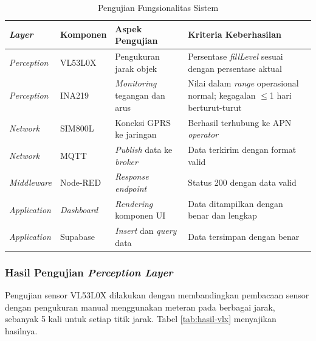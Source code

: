 \begin{table}[H]
  \caption{Pengujian Fungsionalitas Sistem}
  \label{tab:pengujian-fungsionalitas}
  \begin{tabularx}{\textwidth}{| l | l | X | X |}
    \hline
    \textbf{\textit{Layer}} & \textbf{Komponen} & \textbf{Aspek Pengujian} & \textbf{Kriteria Keberhasilan} \\
    \hline
    \textit{Perception} & VL53L0X & Pengukuran jarak objek & Persentase \textit{fillLevel} sesuai dengan persentase aktual \\
    \hline
    \textit{Perception} & INA219 & \textit{Monitoring} tegangan dan arus & Nilai dalam \textit{range} operasional normal; kegagalan $\leq$1 hari berturut-turut \\
    \hline
    \textit{Network} & SIM800L & Koneksi GPRS ke jaringan & Berhasil terhubung ke APN \textit{operator} \\
    \hline
    \textit{Network} & MQTT & \textit{Publish} data ke \textit{broker} & Data terkirim dengan format valid \\
    \hline
    \textit{Middleware} & Node-RED & \textit{Response endpoint} & Status 200 dengan data valid \\
    \hline
    \textit{Application} & \textit{Dashboard} & \textit{Rendering} komponen UI & Data ditampilkan dengan benar dan lengkap \\
    \hline
    \textit{Application} & Supabase & \textit{Insert} dan \textit{query} data & Data tersimpan dengan benar \\
    \hline
  \end{tabularx}
\end{table}

\subsubsection{Hasil Pengujian \textit{Perception Layer}}

Pengujian sensor VL53L0X dilakukan dengan membandingkan pembacaan sensor dengan pengukuran manual menggunakan meteran pada berbagai jarak, sebanyak 5 kali untuk setiap titik jarak. Tabel \ref{tab:hasil-vlx} menyajikan hasilnya.


